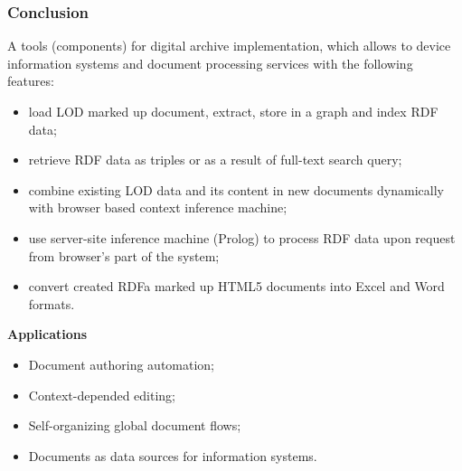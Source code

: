 \documentclass[10pt]{beamer}
\begin{document}
\begin{frame}
  \frametitle{Conclusion}
A tools (components) for digital archive implementation, which allows
to device information systems and document processing services
with the following features:
\begin{itemize}
\item load LOD marked up document, extract, store in a graph and index RDF data;
\item retrieve RDF data as triples or as a result of full-text search query;
\item combine existing LOD data and its content in new documents dynamically with browser based context inference machine;
\item use server-site inference machine (Prolog) to process RDF data upon
  request from browser's part of the system;
\item convert created RDFa marked up HTML5 documents into Excel and Word formats.
\end{itemize}

  \textbf{Applications}
  \begin{itemize}
  \item Document authoring automation;
  \item Context-depended editing;
  \item Self-organizing global document flows;
  \item Documents as data sources for information systems.
  \end{itemize}

\end{frame}
\end{document}
